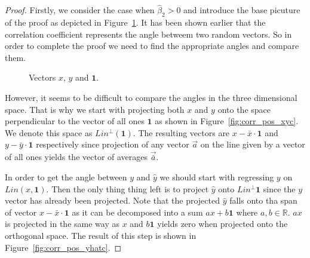 \begin{proof}
Firstly, we consider the case when $\hat \beta_2 > 0$ and introduce the base
picuture of the proof as depicted in Figure~\ref{fig:corr_pos_base}.
It has been shown earlier that the correlation coefficient represents the angle
betweem two random vectors.
So in order to complete the proof we need to find the appropriate angles and compare them.

\begin{figure}[h!]
\caption{Vectors $x$, $y$ and $\mathbf{1}$.}
\label{fig:corr_pos_base}
\end{figure}

However, it seems to be difficult to compare the angles in the three dimensional space.
That is why we start with projecting both $x$ and $y$ onto the space perpendicular to the vector of all ones $\mathbf{1}$ as shown in Figure~\ref{fig:corr_pos_xyc}.
We denote this space as $Lin^{\perp}(\mathbf{1})$. The resulting vectors are $x - \bar x \cdot \mathbf{1}$  and $y - \bar y \cdot \mathbf{1}$ respectively
since projection of any vector $\vec{a}$ on the line given by a vector of all ones yields the vector of averages $\vec{\bar a}$.

In order to get the angle between $y$ and $\hat y$ we should start with regressing $y$ on $Lin(x, \mathbf{1})$.
Then the only thing thing left is to project $\hat y$ onto $Lin^{\perp}\mathbf{1}$ since the $y$ vector has already been projected.
Note that the projected $\hat y$ falls onto tha span of vector $x - \bar x \cdot \mathbf{1}$ as it can be decomposed into a sum $a x + b \mathbf{1}$ where $a, b \in \mathbb{R}$.
$a x$ is projected in the same way as $x$ and $b \mathbf{1}$ yields zero when projected onto the orthogonal space.
The result of this step is shown in Figure~\ref{fig:corr_pos_yhatc}.


\end{proof}
